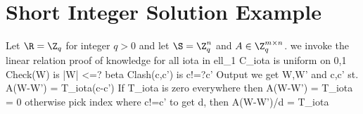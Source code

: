 \section{Short Integer Solution Example}

Let $\R=\Z_q$ for integer $q>0$ and let $\S=\Z_q^n$ and $A\in\Z_q^{m\times n}$.
we invoke the linear relation proof of knowledge for all iota in ell_1
C_iota is uniform on {0,1}
Check(W) is |W| <=? beta
Clash(c,c') is c!=?c'
Output we get W,W' and c,c' st. A(W-W') = T_iota(c-c')
If T_iota is zero everywhere then A(W-W') = T_iota = 0
otherwise pick index where c!=c' to get d, then A(W-W')/d = T_iota









